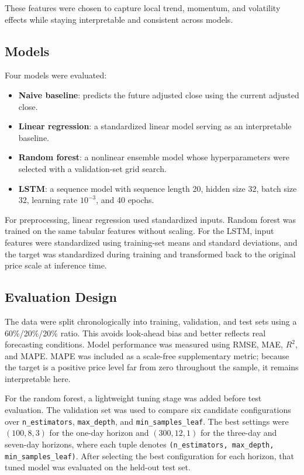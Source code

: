 \documentclass[conference]{IEEEtran}
\begin{document}
These features were chosen to capture local trend, momentum, and volatility effects while staying interpretable and consistent across models.

\subsection{Models}
Four models were evaluated:
\begin{itemize}
    \item \textbf{Naive baseline}: predicts the future adjusted close using the current adjusted close.
    \item \textbf{Linear regression}: a standardized linear model serving as an interpretable baseline.
    \item \textbf{Random forest}: a nonlinear ensemble model whose hyperparameters were selected with a validation-set grid search.
    \item \textbf{LSTM}: a sequence model with sequence length 20, hidden size 32, batch size 32, learning rate $10^{-3}$, and 40 epochs.
\end{itemize}

For preprocessing, linear regression used standardized inputs. Random forest was trained on the same tabular features without scaling. For the LSTM, input features were standardized using training-set means and standard deviations, and the target was standardized during training and transformed back to the original price scale at inference time.

\subsection{Evaluation Design}
The data were split chronologically into training, validation, and test sets using a 60\%/20\%/20\% ratio. This avoids look-ahead bias and better reflects real forecasting conditions. Model performance was measured using RMSE, MAE, $R^2$, and MAPE. MAPE was included as a scale-free supplementary metric; because the target is a positive price level far from zero throughout the sample, it remains interpretable here.

For the random forest, a lightweight tuning stage was added before test evaluation. The validation set was used to compare six candidate configurations over \texttt{n\_estimators}, \texttt{max\_depth}, and \texttt{min\_samples\_leaf}. The best settings were $(100, 8, 3)$ for the one-day horizon and $(300, 12, 1)$ for the three-day and seven-day horizons, where each tuple denotes \texttt{(n\_estimators, max\_depth, min\_samples\_leaf)}. After selecting the best configuration for each horizon, that tuned model was evaluated on the held-out test set.
\end{document}
